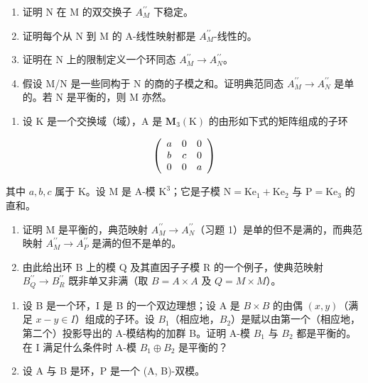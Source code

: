 \begin{enumerate}
\def\labelenumi{\alph{enumi})}
\item
  证明 N 在 M 的双交换子 \(A_{M}^{\prime\prime}\) 下稳定。
\item
  证明每个从 N 到 M 的 A-线性映射都是 \(A_{M}^{\prime\prime}\)-线性的。
\item
  证明在 N 上的限制定义一个环同态 \(A_{M}^{\prime\prime} \to A_{N}^{\prime\prime}\)。
\item
  假设 M/N 是一些同构于 N 的商的子模之和。证明典范同态 \(A_{M}^{\prime\prime} \rightarrow A_{N}^{\prime\prime}\) 是单的。若 N 是平衡的，则 M 亦然。
\end{enumerate}

\begin{enumerate}
\def\labelenumi{\arabic{enumi})}
\setcounter{enumi}{1}
\tightlist
\item
  设 K 是一个交换域（域），A 是 \(\mathbf{M}_{3}(\mathrm{K})\) 的由形如下式的矩阵组成的子环
\end{enumerate}

\[
\left( \begin{array}{c c c} a & 0 & 0 \\ b & c & 0 \\ 0 & 0 & a \end{array} \right)
\]

其中 \(a, b, c\) 属于 K。设 M 是 A-模 \(\mathrm{K}^3\)；它是子模 \(\mathrm{N} = \mathrm{Ke}_1 + \mathrm{Ke}_2\) 与 \(\mathrm{P} = \mathrm{Ke}_3\) 的直和。

\begin{enumerate}
\def\labelenumi{\alph{enumi})}
\item
  证明 M 是平衡的，典范映射 \(A_{M}^{\prime\prime} \rightarrow A_{N}^{\prime\prime}\)（习题 1）是单的但不是满的，而典范映射 \(A_{M}^{\prime\prime} \rightarrow A_{P}^{\prime\prime}\) 是满的但不是单的。
\item
  由此给出环 B 上的模 Q 及其直因子子模 R 的一个例子，使典范映射 \(B_{Q}^{\prime\prime} \rightarrow B_{R}^{\prime\prime}\) 既非单又非满（取 \(B = A \times A\) 及 \(Q = M \times M\)）。
\end{enumerate}

\begin{enumerate}
\def\labelenumi{\arabic{enumi})}
\setcounter{enumi}{2}
\item
  设 B 是一个环，I 是 B 的一个双边理想；设 A 是 \(B \times B\) 的由偶 \((x, y)\)（满足 \(x - y \in I\)）组成的子环。设 \(B_{1}\)（相应地，\(B_{2}\)）是赋以由第一个（相应地，第二个）投影导出的 A-模结构的加群 B。证明 A-模 \(B_{1}\) 与 \(B_{2}\) 都是平衡的。在 I 满足什么条件时 A-模 \(B_{1} \oplus B_{2}\) 是平衡的？
\item
  设 A 与 B 是环，P 是一个 (A, B)-双模。
\end{enumerate}

